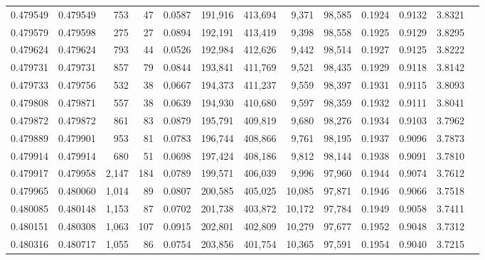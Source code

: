 \begin{tabular}{rrrrrrrrrrrrr}
0.479549 & 0.479549 &   753 &    47 &                                     0.0587 & 191,916 & 413,694 &   9,371 &  98,585 & 0.1924 & 0.9132 & 3.8321 \\
0.479579 & 0.479598 &   275 &    27 &                                     0.0894 & 192,191 & 413,419 &   9,398 &  98,558 & 0.1925 & 0.9129 & 3.8295 \\
0.479624 & 0.479624 &   793 &    44 &                                     0.0526 & 192,984 & 412,626 &   9,442 &  98,514 & 0.1927 & 0.9125 & 3.8222 \\
0.479731 & 0.479731 &   857 &    79 &                                     0.0844 & 193,841 & 411,769 &   9,521 &  98,435 & 0.1929 & 0.9118 & 3.8142 \\
0.479733 & 0.479756 &   532 &    38 &                                     0.0667 & 194,373 & 411,237 &   9,559 &  98,397 & 0.1931 & 0.9115 & 3.8093 \\
0.479808 & 0.479871 &   557 &    38 &                                     0.0639 & 194,930 & 410,680 &   9,597 &  98,359 & 0.1932 & 0.9111 & 3.8041 \\
0.479872 & 0.479872 &   861 &    83 &                                     0.0879 & 195,791 & 409,819 &   9,680 &  98,276 & 0.1934 & 0.9103 & 3.7962 \\
0.479889 & 0.479901 &   953 &    81 &                                     0.0783 & 196,744 & 408,866 &   9,761 &  98,195 & 0.1937 & 0.9096 & 3.7873 \\
0.479914 & 0.479914 &   680 &    51 &                                     0.0698 & 197,424 & 408,186 &   9,812 &  98,144 & 0.1938 & 0.9091 & 3.7810 \\
0.479917 & 0.479958 & 2,147 &   184 &                                     0.0789 & 199,571 & 406,039 &   9,996 &  97,960 & 0.1944 & 0.9074 & 3.7612 \\
0.479965 & 0.480060 & 1,014 &    89 &                                     0.0807 & 200,585 & 405,025 &  10,085 &  97,871 & 0.1946 & 0.9066 & 3.7518 \\
0.480085 & 0.480148 & 1,153 &    87 &                                     0.0702 & 201,738 & 403,872 &  10,172 &  97,784 & 0.1949 & 0.9058 & 3.7411 \\
0.480151 & 0.480308 & 1,063 &   107 &                                     0.0915 & 202,801 & 402,809 &  10,279 &  97,677 & 0.1952 & 0.9048 & 3.7312 \\
0.480316 & 0.480717 & 1,055 &    86 &                                     0.0754 & 203,856 & 401,754 &  10,365 &  97,591 & 0.1954 & 0.9040 & 3.7215 \\

\end{tabular}

